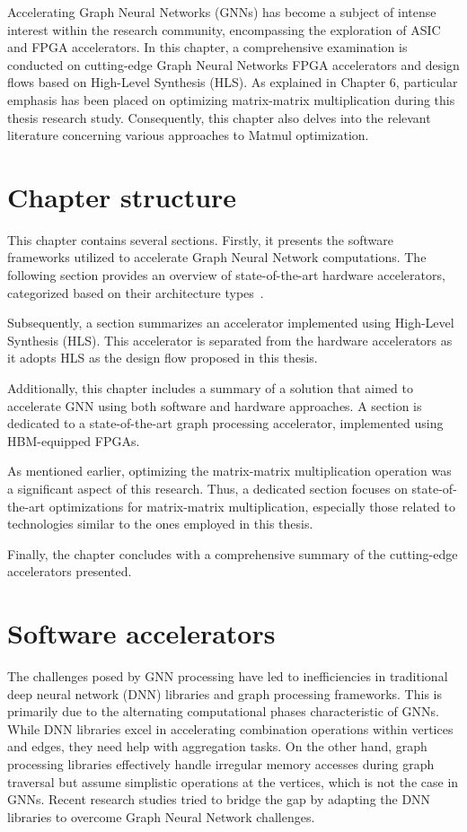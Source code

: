 Accelerating Graph Neural Networks (GNNs) has become a subject of intense interest within the research community, encompassing the exploration of ASIC and FPGA accelerators.
In this chapter, a comprehensive examination is conducted on cutting-edge Graph Neural Networks FPGA accelerators and design flows based on High-Level Synthesis (HLS).
As explained in Chapter 6, particular emphasis has been placed on optimizing matrix-matrix multiplication during this thesis research study.
Consequently, this chapter also delves into the relevant literature concerning various approaches to Matmul optimization.

\section{Chapter structure}
\label{sec:related_work_structure}%
This chapter contains several sections.
Firstly, it presents the software frameworks utilized to accelerate Graph Neural Network computations.
The following section provides an overview of state-of-the-art hardware accelerators, categorized based on their architecture types~\cite{DBLP:journals/corr/abs-2010-00130}.

Subsequently, a section summarizes an accelerator implemented using High-Level Synthesis (HLS). This accelerator is separated from the hardware accelerators as it adopts HLS as the design flow proposed in this thesis.

Additionally, this chapter includes a summary of a solution that aimed to accelerate GNN using both software and hardware approaches.
A section is dedicated to a state-of-the-art graph processing accelerator, implemented using HBM-equipped FPGAs.

As mentioned earlier, optimizing the matrix-matrix multiplication operation was a significant aspect of this research.
Thus, a dedicated section focuses on state-of-the-art optimizations for matrix-matrix multiplication, especially those related to technologies similar to the ones employed in this thesis.

Finally, the chapter concludes with a comprehensive summary of the cutting-edge accelerators presented.

\section{Software accelerators}
\label{sec:related_work_software_accelerators}%

The challenges posed by GNN processing have led to inefficiencies in traditional deep neural network (DNN) libraries and graph processing frameworks.
This is primarily due to the alternating computational phases characteristic of GNNs.
While DNN libraries excel in accelerating combination operations within vertices and edges, they need help with aggregation tasks.
On the other hand, graph processing libraries effectively handle irregular memory accesses during graph traversal but assume simplistic operations at the vertices, which is not the case in GNNs. Recent research studies tried to bridge the gap by adapting the DNN libraries to overcome Graph Neural Network challenges.

